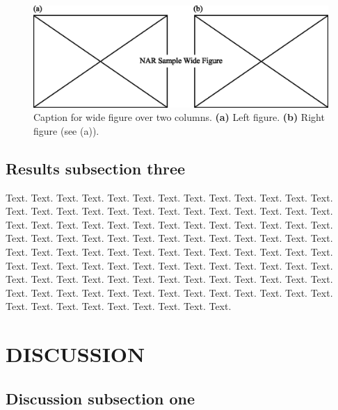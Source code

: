\documentclass[a4,center,fleqn]{NAR}
\begin{document}
\begin{figure}[t]
\begin{center}
\includegraphics{NAR-fig2.eps}
\end{center}
\caption{Caption for wide figure over two columns.
\textbf{(a)} Left figure.
\textbf{(b)} Right figure (see (a)).
}
\label{NAR-fig2}
\end{figure}


\subsection{Results subsection three}

Text. Text. Text. Text. Text. Text. Text. Text. Text. Text. Text.
Text. Text. Text. Text. Text. Text. Text. Text. Text. Text. Text.
Text. Text. Text. Text. Text. Text. Text. Text. Text. Text. Text.
Text. Text. Text. Text. Text. Text. Text. Text. Text. Text. Text.
Text. Text. Text. Text. Text. Text. Text. Text. Text. Text. Text.
Text. Text. Text. Text. Text. Text. Text. Text. Text. Text. Text.
Text. Text. Text. Text. Text. Text. Text. Text. Text. Text. Text.
Text. Text. Text. Text. Text. Text. Text. Text. Text. Text. Text.
Text. Text. Text. Text. Text. Text. Text. Text. Text. Text. Text.
Text. Text. Text. Text. Text. Text. Text. Text. Text. Text. Text.
Text. Text. Text.


\section{DISCUSSION}

\subsection{Discussion subsection one}
\end{document}
